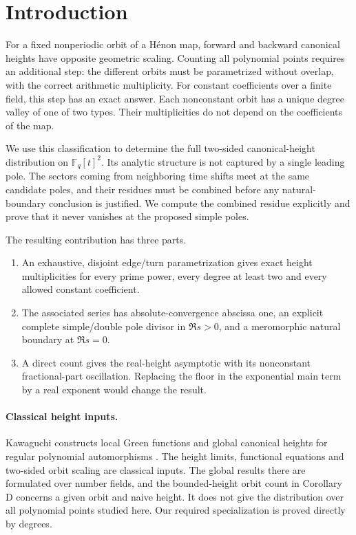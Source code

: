 \section{Introduction}
For a fixed nonperiodic orbit of a H\'enon map, forward and backward
canonical heights have opposite geometric scaling. Counting all
polynomial points requires an additional step: the different orbits
must be parametrized without overlap, with the correct arithmetic
multiplicity. For constant coefficients over a finite field, this
step has an exact answer. Each nonconstant orbit has a unique degree
valley of one of two types. Their multiplicities do not depend on the
coefficients of the map.

We use this classification to determine the full two-sided
canonical-height distribution on $\mathbb F_q[t]^2$. Its analytic
structure is not captured by a single leading pole. The sectors
coming from neighboring time shifts meet at the same candidate poles,
and their residues must be combined before any natural-boundary
conclusion is justified. We compute the combined residue explicitly
and prove that it never vanishes at the proposed simple poles.

The resulting contribution has three parts.
\begin{enumerate}
\item An exhaustive, disjoint edge/turn parametrization gives exact
height multiplicities for every prime power, every degree at least
two and every allowed constant coefficient.
\item The associated series has absolute-convergence abscissa one,
an explicit complete simple/double pole divisor in $\Re s>0$,
and a meromorphic natural boundary at $\Re s=0$.
\item A direct count gives the real-height asymptotic with its
nonconstant fractional-part oscillation. Replacing the floor in
the exponential main term by a real exponent would change the result.
\end{enumerate}

\paragraph{Classical height inputs.}
Kawaguchi constructs local Green functions and global canonical
heights for regular polynomial automorphisms
\citep{kawaguchi2013local}. The height limits, functional equations
and two-sided orbit scaling are classical inputs. The global results
there are formulated over number fields, and the bounded-height
orbit count in Corollary D concerns a given orbit and naive height.
It does not give the distribution over all polynomial points studied
here. Our required specialization is proved directly by degrees.

